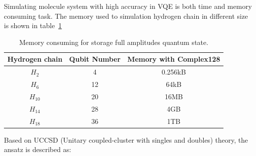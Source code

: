 

Simulating molecule system with high accuracy in VQE is both time and memory consuming task. The memory used to simulation hydrogen chain in different size is shown in table~\ref{tab:memory_h_chain}

\begin{table}[ht]
    \begin{tabular}{ccc}
        \toprule
        Hydrogen chain & Qubit Number & Memory with Complex128 \\
        \midrule
        $H_2$          & 4            & 0.256kB                \\
        $H_6$          & 12           & 64kB                   \\
        $H_{10}$       & 20           & 16MB                   \\
        $H_{14}$       & 28           & 4GB                    \\
        $H_{18}$       & 36           & 1TB                    \\
        \bottomrule
    \end{tabular}
    \caption{Memory consuming for storage full amplitudes quantum state.}
    \label{tab:memory_h_chain}
\end{table}

Based on UCCSD (Unitary coupled-cluster with singles and doubles) theory, the ansatz is described as:

